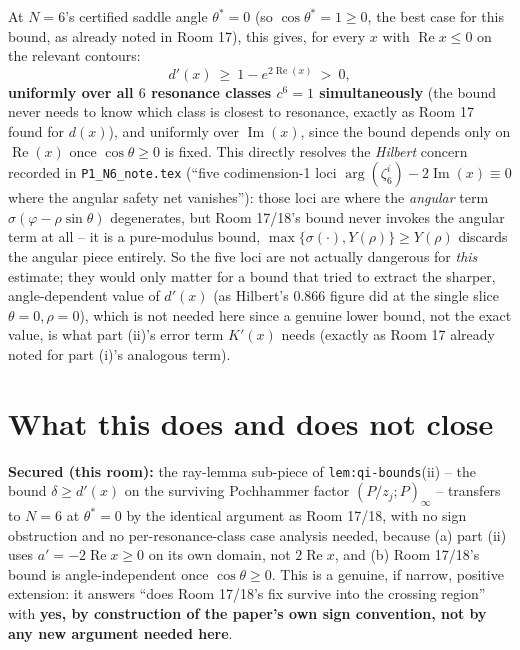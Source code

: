 \documentclass[11pt]{article}
\begin{document}
At $N=6$'s certified saddle angle $\theta^\ast=0$ (so $\cos\theta^\ast=1\ge0$, the best case for
this bound, as already noted in Room 17), this gives, for every $x$ with $\operatorname{Re}x\le0$
on the relevant contours:
\[
 d'(x)\ \ge\ 1-e^{2\operatorname{Re}(x)}\ >\ 0,
\]
\textbf{uniformly over all $6$ resonance classes $c^6=1$ simultaneously} (the bound never needs to
know which class is closest to resonance, exactly as Room 17 found for $d(x)$), and uniformly over
$\operatorname{Im}(x)$, since the bound depends only on $\operatorname{Re}(x)$ once
$\cos\theta\ge0$ is fixed. This directly resolves the \emph{Hilbert} concern recorded in
\texttt{P1\_N6\_note.tex} (``five codimension-1 loci $\arg(\zeta_6^i)-2\operatorname{Im}(x)\equiv0$
where the angular safety net vanishes''): those loci are where the \emph{angular} term
$\sigma(\varphi-\rho\sin\theta)$ degenerates, but Room 17/18's bound never invokes the angular
term at all -- it is a pure-modulus bound, $\max\{\sigma(\cdot),Y(\rho)\}\ge Y(\rho)$ discards the
angular piece entirely. So the five loci are not actually dangerous for \emph{this} estimate; they
would only matter for a bound that tried to extract the sharper, angle-dependent value of $d'(x)$
(as Hilbert's $0.866$ figure did at the single slice $\theta=0,\rho=0$), which is not needed here
since a genuine lower bound, not the exact value, is what part (ii)'s error term $K'(x)$ needs
(exactly as Room 17 already noted for part (i)'s analogous term).

\section*{What this does and does not close}

\textbf{Secured (this room):} the ray-lemma sub-piece of \texttt{lem:qi-bounds}(ii) -- the bound
$\delta\ge d'(x)$ on the surviving Pochhammer factor $(P/z_j;P)_\infty$ -- transfers to $N=6$ at
$\theta^\ast=0$ by the identical argument as Room 17/18, with no sign obstruction and no
per-resonance-class case analysis needed, because (a) part (ii) uses $a'=-2\operatorname{Re}x\ge0$
on its own domain, not $2\operatorname{Re}x$, and (b) Room 17/18's bound is angle-independent once
$\cos\theta\ge0$. This is a genuine, if narrow, positive extension: it answers ``does Room 17/18's
fix survive into the crossing region'' with \textbf{yes, by construction of the paper's own sign
convention, not by any new argument needed here}.
\end{document}
